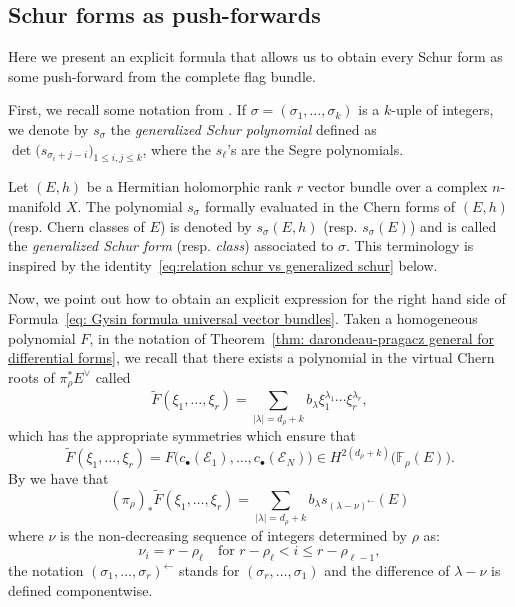 \documentclass[a4paper]{amsart}
\theoremstyle{plain}%
\theoremstyle{definition}
\theoremstyle{remark}
\newcommand{\FF}{\mathbb{F}}
\begin{document}
\subsection{Schur forms as push-forwards}
Here we present an explicit formula that allows us to obtain every Schur form as some push-forward from the complete flag bundle.

First, we recall some notation from \cite{DP17,Fag20}.
If $ \sigma = (\sigma_1,\dots,\sigma_k) $ is a $ k $-uple of integers, we denote by $ s_{\sigma} $ the \emph{generalized Schur polynomial} defined as $ \det \bigl( s_{\sigma_i + j - i} \bigr)_{1 \le i,j \le k} $, where the $ s_\ell $'s are the Segre polynomials.

Let $ (E,h) $ be a Hermitian holomorphic rank $ r $ vector bundle over a complex $ n $-manifold $ X $.
The polynomial $ s_\sigma $ formally evaluated in the Chern forms of $ (E,h) $ (resp. Chern classes of $ E $) is denoted by $ s_\sigma(E,h) $ (resp. $ s_\sigma(E) $) and is called the \emph{generalized Schur form} (resp. \emph{class}) associated to $ \sigma $.
This terminology is inspired by the identity~\eqref{eq:relation schur vs generalized schur} below.

Now, we point out how to obtain an explicit expression for the right hand side of Formula~\eqref{eq: Gysin formula universal vector bundles}.
Taken a homogeneous polynomial $F$, in the notation of Theorem~\ref{thm: darondeau-pragacz general for differential forms}, we recall that there exists a polynomial in the virtual Chern roots of $ \pi_{\rho}^{*}E^{\vee} $ called
$$
\tilde{F}(\xi_1,\dots,\xi_r) = \sum_{|\lambda| = d_{\rho}+k} b_{\lambda} \xi_{1}^{\lambda_1} \cdots \xi_{r}^{\lambda_r} ,
$$
which has the appropriate symmetries which ensure that
\begin{equation*}
	\tilde{F}(\xi_1,\dots,\xi_r) = F\bigl(c_{\bullet}(\mathcal{E}_1),\dots,c_{\bullet}(\mathcal{E}_N)\bigr) \in H^{2(d_{\rho} + k)}\bigl(\FF_{\rho}(E)\bigr) .
\end{equation*}
By \cite[Proposition 1.13]{Fag20} we have that
\begin{equation}\label{eq: darondeau-pragacz classes schur}
	(\pi_{\rho})_{*} \tilde{F}(\xi_1,\dots,\xi_r) = \sum_{|\lambda| = d_{\rho}+k} b_{\lambda} s_{(\lambda-\nu)^{\leftarrow}}(E)
\end{equation}
where $ \nu $ is the non-decreasing sequence of integers determined by $ \rho $ as:
\begin{equation}\label{eq: condition on index generalized schur class}
	\nu_i = r - \rho_{\ell} \quad \text{for } r - \rho_{\ell} < i \le r - \rho_{\ell-1} ,
\end{equation}
the notation $ (\sigma_1,\dots,\sigma_r)^{\leftarrow} $ stands for $ (\sigma_r,\dots,\sigma_1) $ and the difference of $ \lambda - \nu $ is defined componentwise.
\end{document}
